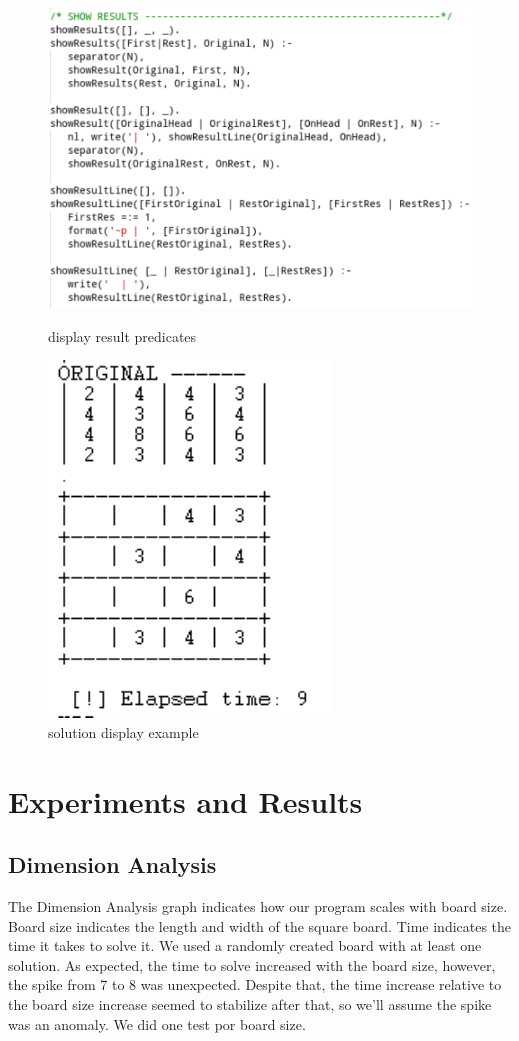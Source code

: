 \documentclass[runningheads]{llncs}
\begin{document}
\begin{figure}[h]
\includegraphics[scale=0.5]{showResults}
\centering
\caption{display result predicates}
\centering
\vspace{5mm}	
\includegraphics[scale=1]{solutionDisplay}
\centering
\caption{solution display example}
\centering
\end{figure}

\section{Experiments and Results}
\subsection{Dimension Analysis}
The Dimension Analysis graph indicates how our program scales with board size. Board size indicates the length and width of the square board.
Time indicates the time it takes to solve it.
We used a randomly created board with at least one solution.
As expected, the time to solve increased with the board size, however, the spike from 7 to 8 was unexpected. Despite that, the time increase relative to the board size increase seemed to stabilize after that, so we'll assume the spike was an anomaly.
We did one test por board size.
\end{document}
